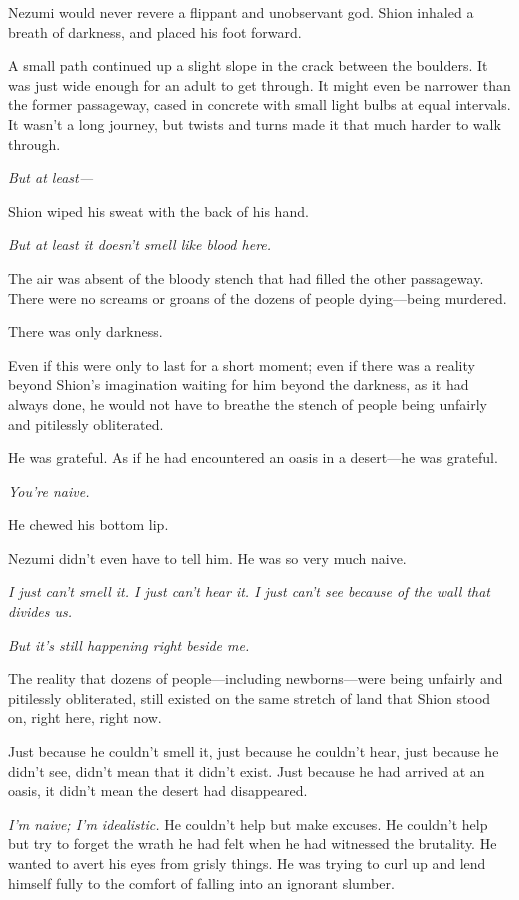 Nezumi would never revere a flippant and unobservant god. Shion inhaled
a breath of darkness, and placed his foot forward.

A small path continued up a slight slope in the crack between the
boulders. It was just wide enough for an adult to get through. It might
even be narrower than the former passageway, cased in concrete with
small light bulbs at equal intervals. It wasn't a long journey, but
twists and turns made it that much harder to walk through.

\emph{But at least---}

Shion wiped his sweat with the back of his hand.

\emph{But at least it doesn't smell like blood here.}

The air was absent of the bloody stench that had filled the other
passageway. There were no screams or groans of the dozens of people
dying---being murdered.

There was only darkness.

Even if this were only to last for a short moment; even if there was a
reality beyond Shion's imagination waiting for him beyond the darkness,
as it had always done, he would not have to breathe the stench of people
being unfairly and pitilessly obliterated.

He was grateful. As if he had encountered an oasis in a desert---he was
grateful.

\emph{You're naive.}

He chewed his bottom lip.

Nezumi didn't even have to tell him. He was so very much naive.

\emph{I just can't smell it. I just can't hear it. I just can't see because of
the wall that divides us.}

\emph{But it's still happening right beside me.}

The reality that dozens of people---including newborns---were being unfairly
and pitilessly obliterated, still existed on the same stretch of land
that Shion stood on, right here, right now.

Just because he couldn't smell it, just because he couldn't hear, just
because he didn't see, didn't mean that it didn't exist. Just because he
had arrived at an oasis, it didn't mean the desert had disappeared.

\emph{I'm naive; I'm idealistic.} He couldn't help but make excuses. He
couldn't help but try to forget the wrath he had felt when he had
witnessed the brutality. He wanted to avert his eyes from grisly things.
He was trying to curl up and lend himself fully to the comfort of
falling into an ignorant slumber.

